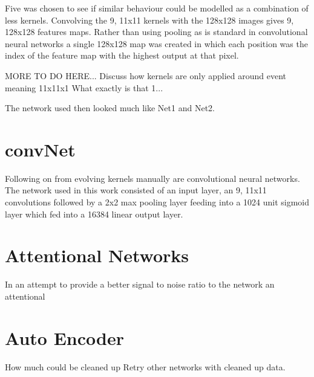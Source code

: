 Five was chosen to see if similar behaviour could be modelled as a combination of less kernels. 
Convolving the 9, 11x11 kernels with the 128x128 images gives 9, 128x128 features maps.
Rather than using pooling as is standard in convolutional neural networks a single 128x128 map was created in which each position was the index of the feature map with the highest output at that pixel. 


MORE TO DO HERE...
Discuss how kernels are only applied around event
meaning 11x11x1
What exactly is that 1...

The network used then looked much like Net1 and Net2. 


\section{convNet}

Following on from evolving kernels manually are convolutional neural networks.
The network used in this work consisted of an input layer, an 9, 11x11 convolutions followed by a 2x2 max pooling layer feeding into a 1024 unit sigmoid layer which fed into a 16384 linear output layer. 





\pagebreak
\section{Attentional Networks}

In an attempt to provide a better signal to noise ratio to the network an attentional 



\section{Auto Encoder}
How much could be cleaned up
Retry other networks with cleaned up data. 

















